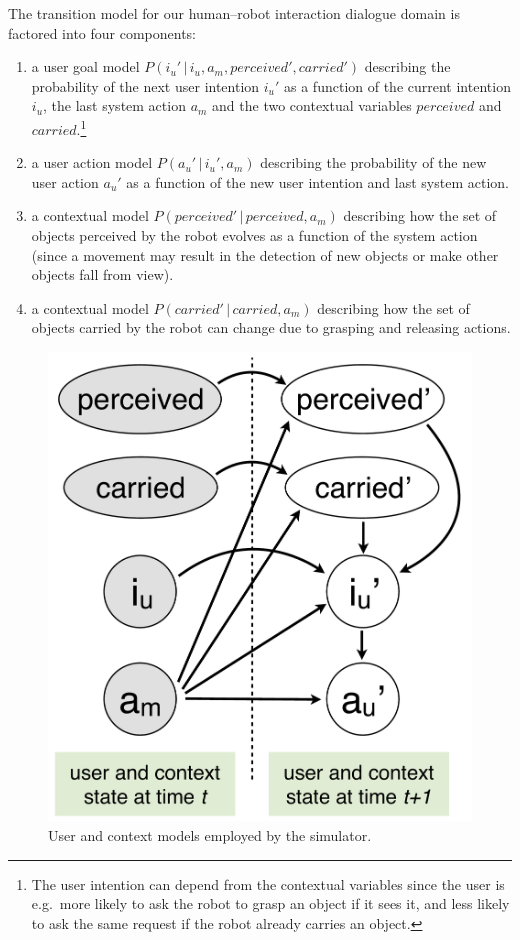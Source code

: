 The transition model for our human--robot interaction dialogue domain is factored into four components:
\begin{enumerate}
\item a user goal model $P(i_u' \, | \, i_u, a_m, \mathit{perceived}', \mathit{carried}')$ describing the probability of the next user intention $i_u'$ as a function of the current intention $i_u$, the last system action $a_m$ and the two contextual variables $\mathit{perceived}$ and $\mathit{carried}$.\footnote{The user intention can depend from the contextual variables since the user is e.g.\ more likely to ask the robot to grasp an object if it sees it, and less likely to ask the same request if the robot already carries an object.}
\item a user action model $P(a_u' \, | \, i_u', a_m)$ describing the probability of the new user action $a_u'$ as a function of the new user intention and last system action.
\item a contextual model $P(\mathit{perceived}' \, | \, \mathit{perceived}, a_m)$ describing how the set of objects perceived by the robot evolves as a function of the system action (since a movement may result in the detection of new objects or make other objects fall from view).
\item a contextual model $P(\mathit{carried}' \, | \, \mathit{carried}, a_m)$ describing how the set of objects carried by the robot can change due to grasping and releasing actions. 
\end{enumerate}

\begin{figure}
\vspace{-2mm}
\centering
\includegraphics[scale=0.25]{imgs/simulatormodels.pdf}
\caption{User and context models employed by the simulator.}
\label{fig:simulatormodels}
\end{figure}

